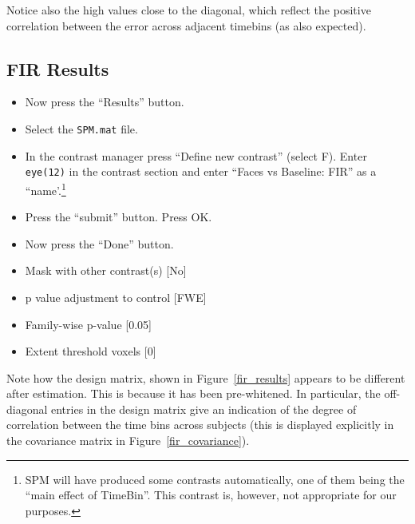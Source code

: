 Notice also the high values close to the diagonal, which reflect the positive correlation between the error across adjacent timebins (as also expected).

\subsection{FIR Results}

\begin{itemize}
\item Now press the ``Results'' button.
\item Select the \texttt{SPM.mat} file.
\item In the contrast manager press ``Define new contrast'' (select F). Enter \texttt{eye(12)} in the contrast section and enter ``Faces vs Baseline: FIR'' as a ``name'.\footnote{SPM will have produced some contrasts automatically, one of them being the ``main effect of TimeBin''. This contrast is, however, not 
appropriate for our purposes.}
\item Press the ``submit'' button. Press OK.
\item Now press the ``Done'' button.
\item Mask with other contrast(s) [No]
\item p value adjustment to control [FWE]
\item Family-wise p-value [0.05]
\item Extent threshold {voxels} [0]
\end{itemize}
Note how the design matrix, shown in Figure~\ref{fir_results} appears to be different after estimation. This is because it has been pre-whitened. In particular, the off-diagonal entries in the design matrix give an indication of the degree of correlation between the time bins across subjects (this is displayed explicitly in the covariance matrix in Figure~\ref{fir_covariance}).

